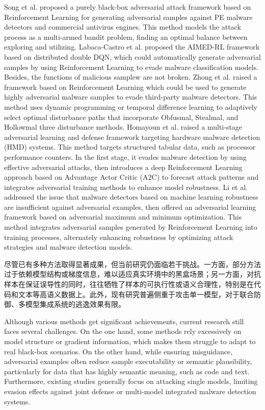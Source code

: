Song et al. proposed a purely black-box adversarial attack framework based on Reinforcement Learning for generating adversarial samples against PE malware detectors and commercial antivirus engines\cite{song2022mab}. This method models the attack process as a multi-armed bandit problem, finding an optimal balance between exploring and utilizing. Labaca-Castro et al. proposed the AIMED-RL framework based on distributed double DQN\cite{labaca2021aimed}, which could automatically generate adversarial samples by using Reinforcement Learning to evade malware classification models. Besides, the functions of malicious samplew are not broken. Zhong et al. raised a framework based on Reinforcement Learning which could be used to generate highly adversarial malware samples to evade third-party malware detectors\cite{zhong2022reinforcement}. This method uses dynamic programming or temporal difference learning to adaptively select optimal disturbance paths that incorporate Obfusmal, Stealmal, and Hollowmal three disturbance methods. Homayoun et al. raised a multi-stage adversarial learning and defense framework targeting hardware malware detection (HMD) systems\cite{he2024beyond}. This method targets structured tabular data, such as processor performance counters. In the first stage, it evades malware detection by using effective adversarial attacks, then introduces a deep Reinforcement Learning approach based on Advantage Actor Critic (A2C) to forecast attack patterns and integrates adversarial training methods to enhance model robustness. Li et al. addressed the issue that malware detectors based on machine learning robustness are insufficient against adversarial examples\cite{ebrahimi2022adversarial}, then offered an adversarial learning framework based on adversarial maximum and minimum optimization. This method integrates adversarial samples generated by Reinforcement Learning into training processes, alternately enhancing robustness by optimizing attack strategies and malware detection models.

尽管已有多种方法取得显著成果，但当前研究仍面临若干挑战。一方面，部分方法过于依赖模型结构或梯度信息，难以适应真实环境中的黑盒场景；另一方面，对抗样本在保证误导性的同时，往往牺牲了样本的可执行性或语义合理性，特别是在代码和文本等高语义数据上。此外，现有研究普遍侧重于攻击单一模型，对于联合防御、多模型集成系统的逃逸效果有限。

Although various methods get significant achievements, current research still faces several challenges. On the one hand, some methods rely excessively on model structure or gradient information, which makes them struggle to adapt to real black-box scenarios. On the other hand, while ensuring misguidance, adversarial examples often reduce sample executability or semantic plausibility, particularly for data that has highly semantic meaning, such as code and text. Furthermore, existing studies generally focus on attacking single models, limiting evasion effects against joint defense or multi-model integrated malware detection systems.


